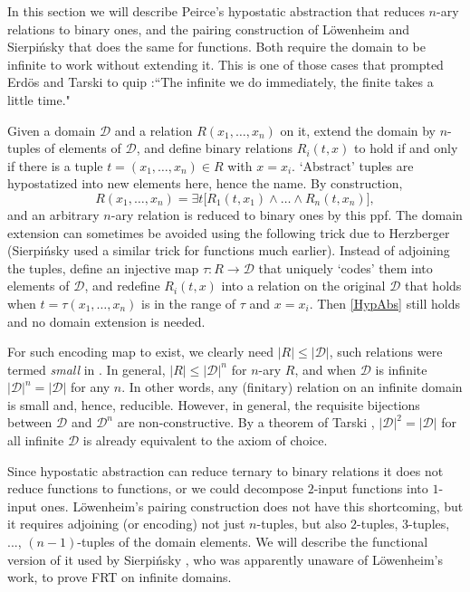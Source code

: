 \documentclass[11pt]{article}
\theoremstyle{plain}
\theoremstyle{definition}
\def\D{\mathcal{D}}
\begin{document}
In this section we will describe Peirce's hypostatic abstraction that reduces $n$-ary relations to binary ones, and the pairing construction of L\"owenheim and Sierpi\'nsky that does the same for functions. Both require the domain to be infinite to work without extending it. This is one of those cases that prompted Erd\"os and Tarski to quip \cite{Zus16}:``The infinite we do immediately, the finite takes a little time."

Given a domain $\D$ and a relation $R(x_1,\dots, x_n)$ on it, extend the domain by $n$-tuples of elements of $\D$, and define binary relations $R_i(t,x)$ to hold if and only if there is a tuple $t=(x_1,\dots, x_n)\in R$ with $x=x_i$.  `Abstract' tuples are hypostatized into new elements here, hence the name. By construction, 
\begin{equation}\label{HypAbs}
R(x_1,\dots,x_n)=\exists t\big[R_1(t,x_1)\land\dots\land R_n(t,x_n)\big],
\end{equation}
and an arbitrary $n$-ary relation is reduced to binary ones by this ppf. The domain extension can sometimes be avoided using the following trick due to Herzberger \cite{Herz} (Sierpi\'nsky used a similar trick for functions much earlier). Instead of adjoining the tuples, define an injective map $\tau:R\to\D$ that uniquely `codes' them into elements of $\D$, and redefine $R_i(t,x)$ into a relation on the original $\D$ that holds when $t=\tau(x_1,\dots,x_n)$ is in the range of $\tau$ and $x=x_i$. Then \eqref{HypAbs} still holds and no domain extension is needed.

For such encoding map to exist, we clearly need $|R|\leq|\D|$, such relations were termed {\it small} in \cite{Kosh22}. In general, $|R|\leq|\D|^n$ for $n$-ary $R$, and when $\D$ is infinite $|\D|^n=|\D|$ for any $n$. In other words, any (finitary) relation on an infinite domain is small and, hence, reducible.  However, in general, the requisite bijections between $\D$ and $\D^n$ are non-constructive. By a theorem of Tarski \cite[11.3]{Jech}, $|\D|^2=|\D|$ for all infinite $\D$ is already equivalent to the axiom of choice. 

Since hypostatic abstraction can reduce ternary to binary relations it does not reduce functions to functions, or we could decompose $2$-input functions into $1$-input ones. L\"owenheim's pairing construction \cite{Low} does not have this shortcoming, but it requires adjoining (or encoding) not just $n$-tuples, but also $2$-tuples, $3$-tuples, ..., $(n-1)$-tuples of the domain elements. We will describe the functional version of it used by Sierpi\'nsky \cite{Sier45}, who was apparently unaware of L\"owenheim's work, to prove FRT on infinite domains. 
\end{document}
